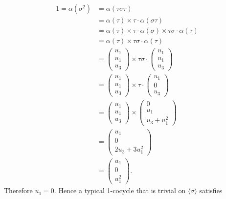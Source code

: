 \begin{align*}
	1 = \alpha(\sigma^2) &= \alpha(\tau\sigma\tau) \\
	&= \alpha(\tau) \times \tau\cdot\alpha(\sigma\tau)\\
	&= \alpha(\tau) \times \tau\cdot\alpha(\sigma) \times \tau\sigma\cdot\alpha(\tau) \\
	&= \alpha(\tau) \times \tau\sigma\cdot\alpha(\tau) \\
	&= \left(\begin{matrix} u_1 \\ u_1 \\ u_3\end{matrix} \right) \times
	\tau\sigma\cdot\left(\begin{matrix} u_1 \\ u_1 \\ u_3\end{matrix} \right)\\
	&= \left(\begin{matrix} u_1 \\ u_1 \\ u_3\end{matrix} \right) \times
	\tau\cdot\left(\begin{matrix} u_1 \\ 0 \\ u_3\end{matrix} \right)\\
	&= \left(\begin{matrix} u_1 \\ u_1 \\ u_3\end{matrix} \right) \times
	\left(\begin{matrix} 0 \\ u_1 \\ u_3 + u_1^2\end{matrix} \right)\\
	&= \left(\begin{matrix} u_1 \\ 0 \\ 2u_3 + 3u_1^2\end{matrix} \right)\\
	&= \left(\begin{matrix} u_1 \\ 0 \\ u_1^2\end{matrix} \right).
\end{align*}
Therefore $u_1 = 0$. Hence a typical 1-cocycle that is trivial on $\langle \sigma \rangle$ satisfies
